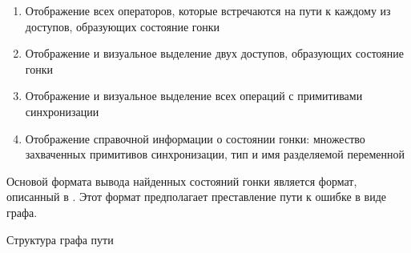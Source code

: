 \begin{enumerate}

\item Отображение всех операторов, которые встречаются на пути к каждому из доступов, образующих состояние гонки

\item Отображение и визуальное выделение двух доступов, образующих состояние гонки

\item Отображение и визуальное выделение всех операций с примитивами синхронизации

\item Отображение справочной информации о состоянии гонки: множество захваченных примитивов синхронизации, тип и имя разделяемой переменной

\end{enumerate}

Основой формата вывода найденных состояний гонки является формат, описанный в .
Этот формат предполагает преставление пути к ошибке в виде графа.


Структура графа пути


\clearpage